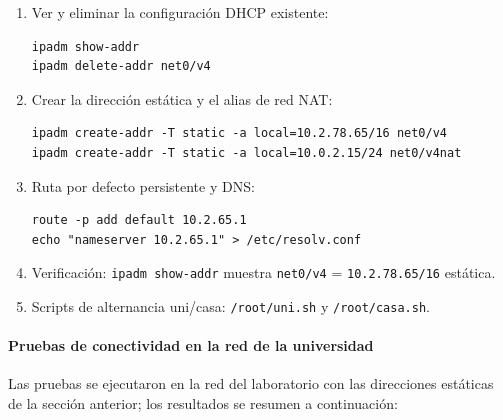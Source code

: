 \documentclass[11pt,a4paper]{report}
\begin{document}
\begin{enumerate}
  \item Ver y eliminar la configuración DHCP existente:
  \begin{verbatim}
ipadm show-addr
ipadm delete-addr net0/v4
  \end{verbatim}
  \item Crear la dirección estática y el alias de red NAT:
  \begin{verbatim}
ipadm create-addr -T static -a local=10.2.78.65/16 net0/v4
ipadm create-addr -T static -a local=10.0.2.15/24 net0/v4nat
  \end{verbatim}
  \item Ruta por defecto persistente y DNS:
  \begin{verbatim}
route -p add default 10.2.65.1
echo "nameserver 10.2.65.1" > /etc/resolv.conf
  \end{verbatim}
  \item Verificación: \texttt{ipadm show-addr} muestra \texttt{net0/v4} = \texttt{10.2.78.65/16} estática.
  \item Scripts de alternancia uni/casa: \texttt{/root/uni.sh} y \texttt{/root/casa.sh}.
\end{enumerate}

\paragraph*{Pruebas de conectividad en la red de la universidad}

Las pruebas se ejecutaron en la red del laboratorio con las direcciones estáticas de la sección anterior; los resultados se resumen a continuación:
\end{document}
